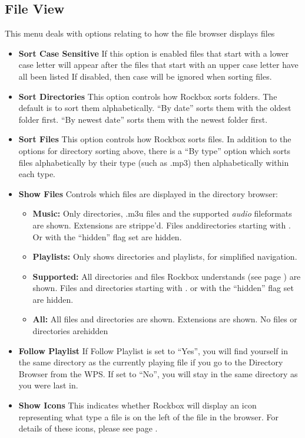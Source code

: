 \subsection{File View}
This menu deals with options relating to how the file browser displays files

\begin{itemize}
\item \textbf{Sort Case Sensitive}
  If this option is enabled files that start with a lower case letter will appear after the files that start with an upper case letter have all been listed  If disabled, then case will be ignored when sorting files.
\item \textbf{Sort Directories}
  This option controls how Rockbox sorts folders.  The default is to sort them alphabetically.  ``By date'' sorts them with the oldest folder first.  ``By newest date'' sorts them with the newest folder first.
  
\item \textbf{Sort Files}
  This option controls how Rockbox sorts files.  In addition to the options for directory sorting above, there is a ``By type'' option which sorts files alphabetically by their type (such as .mp3) then alphabetically within each type.

\item \textbf{\label{ref:ShowFiles}Show Files}
  Controls which files are displayed in the directory browser:

  \begin{itemize}
  \item \textbf{Music: }
    Only directories, .m3u files and the supported \emph{audio} fileformats are shown. Extensions are strippe'd. Files anddirectories starting with . Or with the ``hidden'' flag set are hidden.
  \item \textbf{Playlists:} 
    Only shows directories and playlists, for simplified navigation.
  \item \textbf{Supported:} 
    All directories and files Rockbox understands (see page \pageref{ref:Supportedfileformats}) are shown. Files and directories starting with . or with the ``hidden'' flag set are hidden.
  \item \textbf{All:}
    All files and directories are shown. Extensions are shown. No files or directories arehidden
  \end{itemize}
  
\item \textbf{Follow Playlist}
  If Follow Playlist is set to ``Yes'', you will find yourself in the same directory as the currently playing file if you go to the Directory Browser from the WPS. If set to ``No'', you will stay in the same directory as you were last in.

\item \textbf{Show Icons}
  This indicates whether Rockbox will display an icon representing what type a file is on the left of the file in the browser.  For details of these icons, please see page \pageref{ref:Supportedfileformats}.
\end{itemize}


